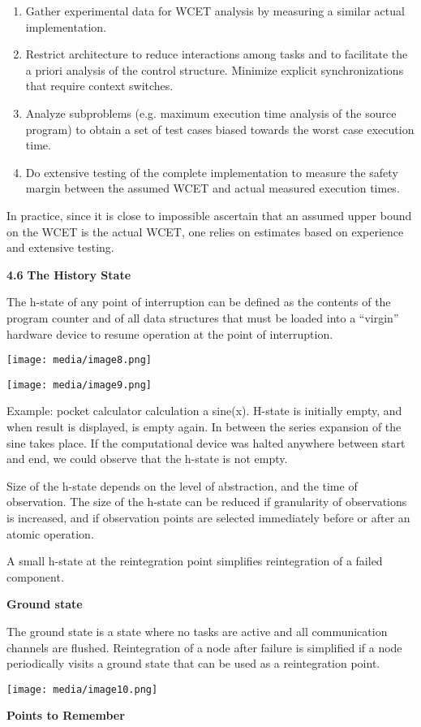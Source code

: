 \begin{enumerate}
\def\labelenumi{\arabic{enumi}.}
\item
  Gather experimental data for WCET analysis by measuring a similar
  actual implementation.
\item
  Restrict architecture to reduce interactions among tasks and to
  facilitate the a priori analysis of the control structure. Minimize
  explicit synchronizations that require context switches.
\item
  Analyze subproblems (e.g. maximum execution time analysis of the
  source program) to obtain a set of test cases biased towards the worst
  case execution time.
\item
  Do extensive testing of the complete implementation to measure the
  safety margin bet­ween the assumed WCET and actual measured execution
  times.
\end{enumerate}

In practice, since it is close to impossible ascertain that an assumed
upper bound on the WCET is the actual WCET, one relies on estimates
based on experience and extensive testing.

\textbf{4.6} \protect\hypertarget{teil7}{}{}\textbf{The History State}

The h-state of any point of interruption can be defined as the contents
of the program counter and of all data structures that must be loaded
into a ``virgin'' hardware device to resume operation at the point of
interruption.

\texttt{[image: media/image8.png]}

\texttt{[image: media/image9.png]}

Example: pocket calculator calculation a sine(x). H-state is initially
empty, and when result is displayed, is empty again. In between the
series expansion of the sine takes place. If the computational device
was halted anywhere between start and end, we could observe that the
h-state is not empty.

Size of the h-state depends on the level of abstraction, and the time of
observation. The size of the h-state can be reduced if granularity of
observations is increased, and if observation points are selected
immediately before or after an atomic operation.

A small h-state at the reintegration point simplifies reintegration of a
failed component.

\textbf{Ground state}

The ground state is a state where no tasks are active and all
communication channels are flushed. Reintegration of a node after
failure is simplified if a node periodically visits a ground state that
can be used as a reintegration point.

\texttt{[image: media/image10.png]}

\protect\hypertarget{teil8}{}{}\textbf{Points to Remember}
